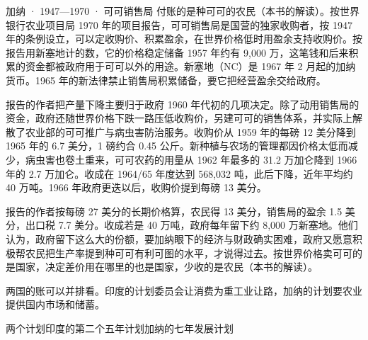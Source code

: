 \begin{case}{加纳 · 1947—1970 · 可可销售局}
付账的是种可可的农民（本书的解读）。按世界银行农业项目局 1970 年的项目报告，可可销售局是国营的独家收购者，按 1947 年的条例设立，可以定收购价、积累盈余，在世界价格低时用盈余支持收购价\cite{wbcocoa1970}。按报告用新塞地计的数，它的价格稳定储备 1957 年约有 9,000 万，这笔钱和后来积累的资金都被政府用于可可以外的用途\cite{wbcocoa1970}。新塞地（NC）是 1967 年 2 月起的加纳货币\cite{wbstab1967}。1965 年的新法律禁止销售局积累储备，要它把经营盈余交给政府\cite{wbcocoa1970}。

报告的作者把产量下降主要归于政府 1960 年代初的几项决定\cite{wbcocoa1970}。除了动用销售局的资金，政府还随世界价格下跌一路压低收购价，另建可可的销售体系，并实际上解散了农业部的可可推广与病虫害防治服务\cite{wbcocoa1970}。收购价从 1959 年的每磅 12 美分降到 1965 年的 6.7 美分，1 磅约合 0.45 公斤\cite{wbcocoa1970}。新种植与农场的管理都因价格太低而减少，病虫害也卷土重来，可可农药的用量从 1962 年最多的 31.2 万加仑降到 1966 年的 2.7 万加仑\cite{wbcocoa1970}。收成在 1964/65 年度达到 568,032 吨，此后下降，近年平均约 40 万吨\cite{wbcocoa1970}。1966 年政府更迭以后，收购价提到每磅 13 美分\cite{wbcocoa1970}。

报告的作者按每磅 27 美分的长期价格算，农民得 13 美分，销售局的盈余 1.5 美分，出口税 7.7 美分\cite{wbcocoa1970}。收成若是 40 万吨，政府每年留下约 8,000 万新塞地\cite{wbcocoa1970}。他们认为，政府留下这么大的份额，要加纳眼下的经济与财政确实困难，政府又愿意积极帮农民把生产率提到种可可有利可图的水平，才说得过去\cite{wbcocoa1970}。按世界价格卖可可的是国家，决定差价用在哪里的也是国家，少收的是农民（本书的解读）。
\end{case}

两国的账可以并排看。印度的计划委员会让消费为重工业让路，加纳的计划要农业提供国内市场和储蓄。

\begin{compare}{两个计划}{印度的第二个五年计划}{加纳的七年发展计划}
\end{compare}

